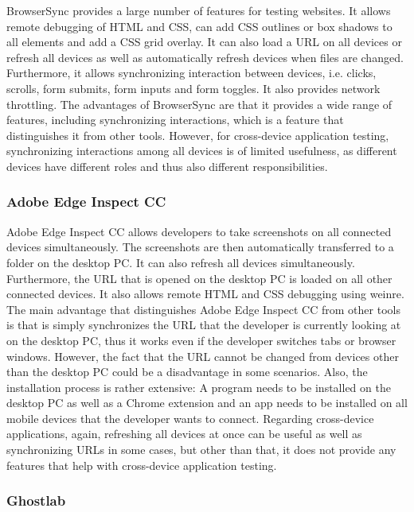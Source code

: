 BrowserSync provides a large number of features for testing websites. It allows remote debugging of HTML and CSS, can add CSS outlines or box shadows to all elements and add a CSS grid overlay. It can also load a URL on all devices or refresh all devices as well as automatically refresh devices when files are changed. Furthermore, it allows synchronizing interaction between devices, i.e. clicks, scrolls, form submits, form inputs and form toggles. It also provides network throttling. The advantages of BrowserSync are that it provides a wide range of features, including synchronizing interactions, which is a feature that distinguishes it from other tools. However, for cross-device application testing, synchronizing interactions among all devices is of limited usefulness, as different devices have different roles and thus also different responsibilities.

\subsubsection{Adobe Edge Inspect CC}

Adobe Edge Inspect CC allows developers to take screenshots on all connected devices simultaneously. The screenshots are then automatically transferred to a folder on the desktop PC. It can also refresh all devices simultaneously. Furthermore, the URL that is opened on the desktop PC is loaded on all other connected devices. It also allows remote HTML and CSS debugging using weinre. The main advantage that distinguishes Adobe Edge Inspect CC from other tools is that is simply synchronizes the URL that the developer is currently looking at on the desktop PC, thus it works even if the developer switches tabs or browser windows. However, the fact that the URL cannot be changed from devices other than the desktop PC could be a disadvantage in some scenarios. Also, the installation process is rather extensive: A program needs to be installed on the desktop PC as well as a Chrome extension and an app needs to be installed on all mobile devices that the developer wants to connect. Regarding cross-device applications, again, refreshing all devices at once can be useful as well as synchronizing URLs in some cases, but other than that, it does not provide any features that help with cross-device application testing.

\subsubsection{Ghostlab}


